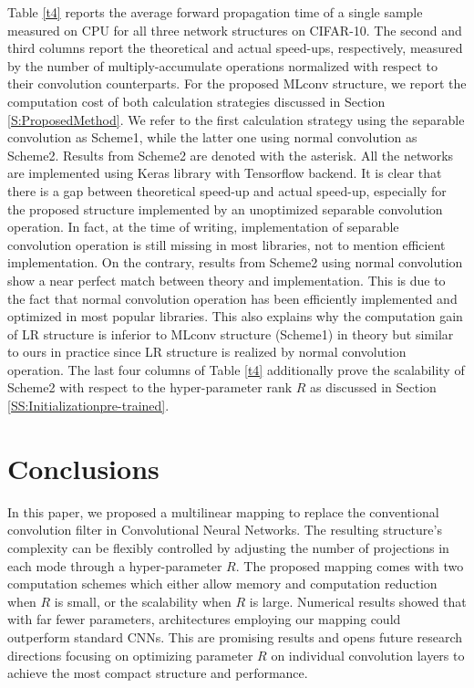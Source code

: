 \documentclass[conference,usletter]{IEEEtran}
\begin{document}
Table \ref{t4} reports the average forward propagation time of a single sample measured on CPU for all three network structures on CIFAR-10. The second and third columns report the theoretical and actual speed-ups, respectively, measured by the number of multiply-accumulate operations normalized with respect to their convolution counterparts. For the proposed MLconv structure, we report the computation cost of both calculation strategies discussed in Section \ref{S:ProposedMethod}. We refer to the first calculation strategy using the separable convolution as Scheme1, while the latter one using normal convolution as Scheme2. Results from Scheme2 are denoted with the asterisk. All the networks are implemented using Keras library \cite{chollet2015} with Tensorflow \cite{tensorflow2015paper} backend. It is clear that there is a gap between theoretical speed-up and actual speed-up, especially for the proposed structure implemented by an unoptimized separable convolution operation. In fact, at the time of writing, implementation of separable convolution operation is still missing in most libraries, not to mention efficient implementation. On the contrary, results from Scheme2 using normal convolution show a near perfect match between theory and implementation. This is due to the fact that normal convolution operation has been efficiently implemented and optimized in most popular libraries. This also explains why the computation gain of LR structure is inferior to MLconv structure (Scheme1) in theory but similar to ours in practice since LR structure is realized by normal convolution operation. The last four columns of Table \ref{t4} additionally prove the scalability of Scheme2 with respect to the hyper-parameter rank $R$ as discussed in Section \ref{SS:Initializationpre-trained}.



\section{Conclusions}
In this paper, we proposed a multilinear mapping to replace the conventional convolution filter in Convolutional Neural Networks. The resulting structure's complexity can be flexibly controlled by adjusting the number of projections in each mode through a hyper-parameter $R$. The proposed mapping comes with two computation schemes which either allow memory and computation reduction when $R$ is small, or the scalability when $R$ is large. Numerical results showed that with far fewer parameters, architectures employing our mapping could outperform standard CNNs. This are promising results and opens future research directions focusing on optimizing parameter $R$ on individual convolution layers to achieve the most compact structure and performance.
	
	


\end{document}
